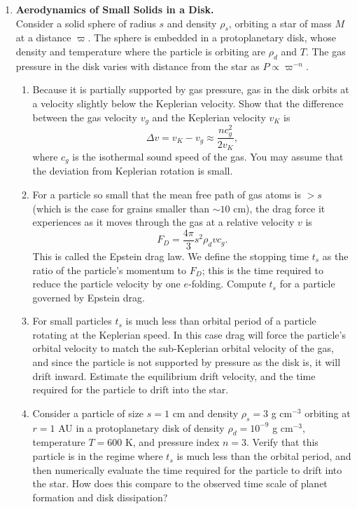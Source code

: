 \begin{enumerate}
\item {\bf Aerodynamics of Small Solids in a Disk.}\\
Consider a solid sphere of radius $s$ and density $\rho_s$, orbiting a star of mass $M$ at a distance $\varpi$. The sphere is embedded in a protoplanetary disk, whose density and temperature where the particle is orbiting are $\rho_d$ and $T$. The gas pressure in the disk varies with distance from the star as $P\propto \varpi^{-n}$.
\begin{enumerate}
\item Because it is partially supported by gas pressure, gas in the disk orbits at a velocity slightly below the Keplerian velocity. Show that the difference between the gas velocity $v_g$ and the Keplerian velocity $v_K$ is
\begin{displaymath}
\Delta v = v_K - v_g \approx \frac{n c_g^2}{2v_K},
\end{displaymath}
where $c_g$ is the isothermal sound speed of the gas. You may assume that the deviation from Keplerian rotation is small.
\item For a particle so small that the mean free path of gas atoms is $> s$ (which is the case for grains smaller than $\sim 10$ cm), the drag force it experiences as it moves through the gas at a relative velocity $v$ is
\begin{displaymath}
F_D = \frac{4\pi}{3} s^2 \rho_d v c_g.
\end{displaymath}
This is called the Epstein drag law. We define the stopping time $t_s$ as the ratio of the particle's momentum to $F_D$; this is the time required to reduce the particle velocity by one $e$-folding. Compute $t_s$ for a particle governed by Epstein drag.
\item For small particles $t_s$ is much less than orbital period of a particle rotating at the Keplerian speed. In this case drag will force the particle's orbital velocity to match the sub-Keplerian orbital velocity of the gas, and since the particle is not supported by pressure as the disk is, it will drift inward. Estimate the equilibrium drift velocity, and the time required for the particle to drift into the star.
\item Consider a particle of size $s=1$ cm and density $\rho_s = 3$ g cm$^{-3}$ orbiting at $r=1$ AU in a protoplanetary disk of density $\rho_d=10^{-9}$ g cm$^{-3}$, temperature $T=600$ K, and pressure index $n=3$. Verify that this particle is in the regime where $t_s$ is much less than the orbital period, and then numerically evaluate the time required for the particle to drift into the star. How does this compare to the observed time scale of planet formation and disk dissipation?
\end{enumerate}

\end{enumerate}
